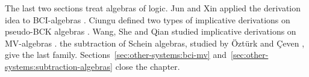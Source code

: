 The last two sections treat algebras of logic. Jun and Xin applied the
derivation idea to BCI-algebras
\cite[Definition~3.5, p.~170]{JunXin2004}. Ciungu defined two types of
implicative derivations on pseudo-BCK algebras
\cite[p.~178]{Ciungu2021}. Wang, She and Qian studied implicative
derivations on MV-algebras
\cite[Definition~3.1, p.~262]{WangSheQian2019}. the subtraction of Schein
algebras, studied by {\"O}zt{\"u}rk and {\c{C}}even
\cite[Definition~3.1, p.~511]{OzturkCeven2009}, give the last family.
Sections~\ref{sec:other-systems:bci-mv}
and~\ref{sec:other-systems:subtraction-algebras} close the chapter.
